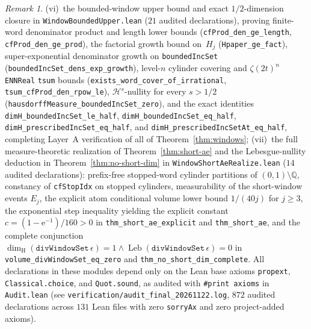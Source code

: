 \documentclass[11pt]{article}
\theoremstyle{definition}
\theoremstyle{remark}
\newtheorem{remark}[theorem]{Remark}
\newcommand{\Q}{\mathbb{Q}}
\newcommand{\ee}{\mathrm{e}}
\newcommand{\dimH}{\dim_{\mathrm{H}}}
\begin{document}
\begin{remark}
(vi)~the bounded-window upper bound and exact $1/2$-dimension closure in \texttt{WindowBoundedUpper.lean} ($21$ audited declarations), proving finite-word denominator product and length lower bounds (\texttt{cfProd\_\allowbreak den\_\allowbreak ge\_\allowbreak length}, \texttt{cfProd\_\allowbreak den\_\allowbreak ge\_\allowbreak prod}), the factorial growth bound on~$H_j$ (\texttt{Hpaper\_\allowbreak ge\_\allowbreak fact}), super-exponential denominator growth on \texttt{boundedIncSet} (\texttt{boundedIncSet\_\allowbreak dens\_\allowbreak exp\_\allowbreak growth}), level-$n$ cylinder covering and $\zeta(2t)^n$ \texttt{ENNReal} \texttt{tsum} bounds (\texttt{exists\_\allowbreak word\_\allowbreak cover\_\allowbreak of\_\allowbreak irrational}, \texttt{tsum\_\allowbreak cfProd\_\allowbreak den\_\allowbreak rpow\_\allowbreak le}), $\mathcal H^s$-nullity for every $s>1/2$ (\texttt{hausdorffMeasure\_\allowbreak boundedIncSet\_\allowbreak zero}), and the exact identities \texttt{dimH\_\allowbreak boundedIncSet\_\allowbreak le\_\allowbreak half}, \texttt{dimH\_\allowbreak boundedIncSet\_\allowbreak eq\_\allowbreak half}, \texttt{dimH\_\allowbreak prescribedIncSet\_\allowbreak eq\_\allowbreak half}, and \texttt{dimH\_\allowbreak prescribedIncSetAt\_\allowbreak eq\_\allowbreak half}, completing Layer~A verification of all of Theorem~\ref{thm:windows};
(vii)~the full measure-theoretic realization of Theorem~\ref{thm:short-ae} and the Lebesgue-nullity deduction in Theorem~\ref{thm:no-short-dim} in \texttt{WindowShortAeRealize.lean} ($14$ audited declarations): prefix-free stopped-word cylinder partitions of $(0,1)\setminus\Q$, constancy of \texttt{cfStopIdx} on stopped cylinders, measurability of the short-window events $E_j$, the explicit atom conditional volume lower bound $1/(40j)$ for $j\ge3$, the exponential step inequality yielding the explicit constant $c=(1-\ee^{-1})/160>0$ in \texttt{thm\_\allowbreak short\_\allowbreak ae\_\allowbreak explicit} and \texttt{thm\_\allowbreak short\_\allowbreak ae}, and the complete conjunction $\dimH(\texttt{divWindowSet}\,\epsilon)=1\wedge\operatorname{Leb}(\texttt{divWindowSet}\,\epsilon)=0$ in \texttt{volume\_\allowbreak divWindowSet\_\allowbreak eq\_\allowbreak zero} and \texttt{thm\_\allowbreak no\_\allowbreak short\_\allowbreak dim\_\allowbreak complete}.
All declarations in these modules depend only on the Lean base axioms \texttt{propext}, \texttt{Classical.choice}, and \texttt{Quot.sound}, as audited with \texttt{\#print axioms} in \texttt{Audit.lean} (see \texttt{verification/\allowbreak audit\_\allowbreak final\_\allowbreak 20261122.log}, $872$ audited declarations across $131$ Lean files with zero \texttt{sorryAx} and zero project-added axioms).
\end{remark}
\end{document}
